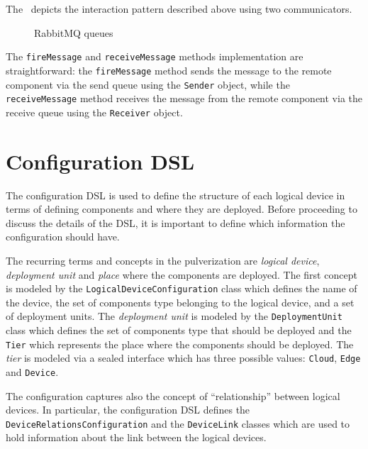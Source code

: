 The~ depicts the interaction pattern described above using two communicators.

\begin{figure}
	\centering
	\caption{RabbitMQ queues}
	\label{fig:rabbitmq-queues}
\end{figure}

The \texttt{fireMessage} and \texttt{receiveMessage} methods implementation are straightforward: the \texttt{fireMessage} method sends the message
to the remote component via the send queue using the \texttt{Sender} object, while the \texttt{receiveMessage} method receives the message from the
remote component via the receive queue using the \texttt{Receiver} object.


\section{Configuration DSL}
\label{sec:configuration-dsl-impl}

The configuration DSL is used to define the structure of each logical device in terms of defining components and where they are deployed.
Before proceeding to discuss the details of the DSL, it is important to define which information the configuration should have.

The recurring terms and concepts in the pulverization are \emph{logical device}, \emph{deployment unit} and \emph{place} where the components are
deployed. The first concept is modeled by the \texttt{LogicalDeviceConfiguration} class which defines the name of the device, the set of components
type belonging to the logical device, and a set of deployment units.
The \emph{deployment unit} is modeled by the \texttt{DeploymentUnit} class which defines the set of components type that should be deployed and the
\texttt{Tier} which represents the place where the components should be deployed. The \emph{tier} is modeled via a sealed interface which has
three possible values: \texttt{Cloud}, \texttt{Edge} and \texttt{Device}.

The configuration captures also the concept of ``relationship'' between logical devices. In particular, the configuration DSL defines
the \texttt{DeviceRelationsConfiguration} and the \texttt{DeviceLink} classes which are used to hold information about the link between the logical
devices.


